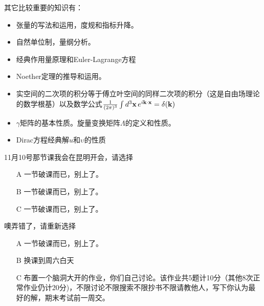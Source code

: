 \documentclass[CJK]{beamer}
\begin{document}
\begin{frame}
\bch
其它比较重要的知识有：
\begin{itemize}
\item{张量的写法和运用，度规和指标升降。}
\item{自然单位制，量纲分析。}
\item{经典作用量原理和Euler-Lagrange方程}
\item{Noether定理的推导和运用。}
\item{实空间的二次项的积分等于傅立叶空间的同样二次项的积分（这是自由场理论的数学根基）以及数学公式$\frac{1}{(2\pi)^3}\int d^3{\mathbf{x}}\,e^{i{\mathbf{k}}\cdot{\mathbf{x}}} = \delta({\mathbf{k}})$}
\item{$\gamma$矩阵的基本性质。旋量变换矩阵$\Lambda$的定义和性质。}
\item{Dirac方程经典解$u$和$\upsilon$的性质}
\end{itemize}
\ech
\end{frame}

\begin{frame}
\bch
11月10号那节课我会在昆明开会，请选择
\begin{itemize}
\item[A]{一节破课而已，别上了。}
\item[B]{一节破课而已，别上了。}
\item[C]{一节破课而已，别上了。}
\end{itemize}
\ech
\end{frame}

\begin{frame}
\bch
噢弄错了，请重新选择
\begin{itemize}
\item[A]{一节破课而已，别上了。}
\item[B]{换课到周六白天}
\item[C]{布置一个脑洞大开的作业，你们自己讨论。该作业共5题计10分（其他8次正常作业仍计20分)，不限讨论不限搜索不限抄书不限请教他人，写下你认为最好的解，期末考试前一周交。}
\end{itemize}
\ech
\end{frame}
\end{document}
